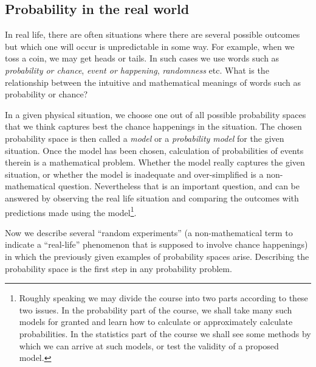 \documentclass[preprint,  11pt]{amsart}
\theoremstyle{plain} %
\theoremstyle{definition} %
\begin{document}
\subsection{Probability in the real world} In real life, there are often situations where there are several possible outcomes but which one will occur is unpredictable in some way. For example, when we toss a coin, we may get heads or tails. In such cases we use words such as {\em probability or chance}, {\em event or happening}, {\em randomness} etc.  What is the relationship between the intuitive and mathematical meanings of words such as probability or chance?

 In a given physical situation, we choose one out of all possible probability spaces that we think captures best the chance happenings in the situation. The chosen probability space is then called a {\em model} or a {\em probability model} for the given situation. Once the model has been chosen, calculation of probabilities of events therein is a mathematical problem. Whether the model really captures the given situation, or whether the model is inadequate and over-simplified is a non-mathematical question. Nevertheless that is an important question, and can be answered by observing the real life situation and comparing the outcomes with predictions made using the model\footnote{Roughly speaking we may divide the course into two parts according to these two issues. In the probability part of the course, we shall take many such models for granted and learn how to calculate or approximately calculate probabilities. In the statistics part of the course we shall see some methods by which we can arrive at such models, or test the validity of a proposed model.}.

 Now we describe several ``random experiments'' (a non-mathematical term to indicate a ``real-life'' phenomenon that is supposed to involve chance happenings) in which the previously given examples of probability spaces arise. Describing the probability space is the first step in any probability problem.
\end{document}
